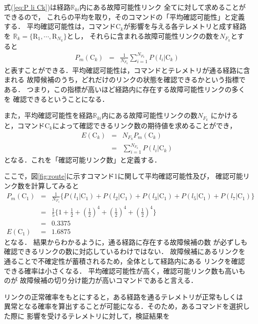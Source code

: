 \documentclass[11pt]{jsreport}
\begin{document}
式(\ref{eq:P li Ck})は経路$\mathbb{R}_{ki}$内にある故障可能性リンク
全てに対して求めることができるので，
これらの平均を取り，そのコマンドの「平均確認可能性」と定義する．
平均確認可能性は，コマンドC$_k$が影響を与える各テレメトリと成す経路を
$\mathbb{R}_{k} = \{ \text{R}_{1}, \cdots ,\text{R}_{N_{k}} \}$とし，
それらに含まれる故障可能性リンクの数を$N_{F_k}$とすると
\begin{eqnarray}
   P_m(\text{C}_k) &=& \frac{1}{N_{F_k}}\sum_{i=1}^{N_{F_k}}P(l_i|\text{C}_k)
\end{eqnarray} %
と表すことができる．平均確認可能性は，コマンドとテレメトリが通る経路に含まれる
故障候補のうち，どれだけのリンクの状態を確認できるかという指標である．
つまり，この指標が高いほど経路内に存在する故障可能性リンクの多くを
確認できるということになる．%

また，平均確認可能性を経路$\mathbb{R}_{ki}$内にある故障可能性リンクの数$N_{F_k}$
にかけると，コマンドC$_k$によって確認できるリンク数の期待値を求めることができ，
\begin{eqnarray}
   E(\text{C}_k) &=& N_{F_k}P_m(\text{C}_k)\\
   &=& \sum_{i=1}^{N_{F_k}}P(l_i|\text{C}_k)
\end{eqnarray} 
となる．これを「確認可能リンク数」と定義する．

ここで，図\ref{fig:route}に示すコマンド1に関して平均確認可能性及び，
確認可能リンク数を計算してみると
\begin{eqnarray}
   P_m(\text{C}_1) &=& \frac{1}{N_{F_1}} \{P(l_{1} | \text{C}_1) + P(l_{2} | \text{C}_1) +P(l_{3} | \text{C}_1)
   +P(l_{5} | \text{C}_1) + P(l_{7} | \text{C}_1)\} \\
   &=& \frac{1}{5} \{ 1 + \frac{1}{2} + \left( \frac{1}{2}\right)^4 + \left( \frac{1}{2}\right)^4
    + \left( \frac{1}{2}\right)^4 \}\\
    &=& 0.3375 \\
   E(\text{C}_1)  &=& 1.6875
\end{eqnarray} 
となる．
結果からわかるように，通る経路に存在する故障候補の数
が必ずしも確認できるリンクの数に対応しているわけではない．
故障候補にあるリンクを通ることで不確定性が蓄積されるため，全体として経路内にある
リンクを確認できる確率は小さくなる．
平均確認可能性が高く，確認可能リンク数も高いものが
故障候補の切り分け能力が高いコマンドであると言える．

リンクの正常確率をもとにすると，ある経路を通るテレメトリが正常もしくは
異常となる確率を算出することが可能になる．そのため，あるコマンドを選択した際に
影響を受けるテレメトリに対して，検証結果を
\end{document}
